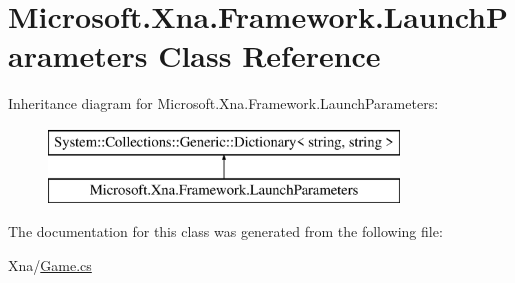 \hypertarget{class_microsoft_1_1_xna_1_1_framework_1_1_launch_parameters}{}\section{Microsoft.\+Xna.\+Framework.\+Launch\+Parameters Class Reference}
\label{class_microsoft_1_1_xna_1_1_framework_1_1_launch_parameters}
Inheritance diagram for Microsoft.\+Xna.\+Framework.\+Launch\+Parameters\+:\begin{figure}[H]
\begin{center}
\leavevmode
\includegraphics[height=2.000000cm]{class_microsoft_1_1_xna_1_1_framework_1_1_launch_parameters}
\end{center}
\end{figure}


The documentation for this class was generated from the following file\+:\begin{DoxyCompactItemize}
\item 
Xna/\hyperlink{_game_8cs}{Game.\+cs}\end{DoxyCompactItemize}
